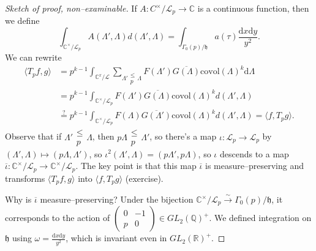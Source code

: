 \documentclass{article}
\theoremstyle{definition}
\begin{document}
\begin{proof}[Sketch of proof, non--examinable]
    If $A : C^\times / \mathcal{L}_p \to \mathbb{C}$ is a continuous function, then we define \[
    \int_{\mathbb{C}^\times/\mathcal{L}_p}^{} A(\Lambda',\Lambda)d(\Lambda',\Lambda) = \int_{\Gamma_0(p)/\mathfrak{h}}^{} a(\tau) \frac{\mathrm{d}x\mathrm{d}y}{y^2}.
    \]
    We can rewrite 
    \begin{align*}
        \langle T_p f, g \rangle &= p^{k-1} \int_{\mathbb{C}^x / \mathcal{L}}^{} \sum_{\Lambda' \substack{\le \\ p} \Lambda}^{} F(\Lambda')\overline{G(\Lambda )}\text{covol}(\Lambda)^k\mathrm{d}\Lambda \\
        &= p^{k-1} \int_{\mathbb{C}^\times/\mathcal{L}_p}^{} F(\Lambda')\overline{G(\Lambda)}\text{covol}(\Lambda)^k d(\Lambda',\Lambda) \\
        &\stackrel{?}{=} p^{k-1} \int_{\mathbb{C}^\times/\mathcal{L}_p}^{} F(\Lambda)\overline{G(\Lambda')}\text{covol}(\Lambda)^k d(\Lambda',\Lambda) = \langle f, T_p g \rangle.
    \end{align*}
    Observe that if $\Lambda' \substack{\le  \\ p}\Lambda$, then $p \Lambda \substack{\le \\ p}\Lambda'$, so there's a map $\iota  : \mathcal{L}_p \to \mathcal{L}_p$ by $(\Lambda',\Lambda)\mapsto (p \Lambda, \Lambda')$, so $\iota^2(\Lambda',\Lambda)=(p \Lambda', p \Lambda)$, so $\iota$ descends to a map $\overline{\iota} \colon \mathbb{C}^\times / \mathcal{L}_p \to \mathbb{C}^\times / \mathcal{L}_p$. The key point is that this map $\overline{\iota}$ is measure--preserving and transforms $\langle T_p f, g \rangle$ into $\langle f, T_p g \rangle$ (exercise).
    \vspace{1mm}
     
    Why is $\overline{\iota}$ measure--preserving? Under the bijection $\mathbb{C}^\times / \mathcal{L}_p \stackrel{\sim}{\to} \Gamma_0(p)/\mathfrak{h}$, it corresponds to the action of $\begin{pmatrix} 0 & -1 \\ p & 0 \end{pmatrix} \in GL_2(\mathbb{Q})^+$. We defined integration on $\mathfrak{h}$ using $\omega = \frac{\mathrm{d}x\mathrm{d}y}{y^2}$, which is invariant even in $GL_2(\mathbb{R})^+$.
\end{proof}

\end{document}

